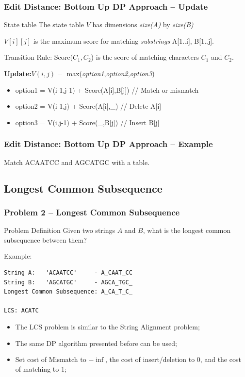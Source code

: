 \begin{frame}
  \frametitle{Edit Distance: Bottom Up DP Approach -- Update}
  \begin{block}{State table}
    The state table $V$ has dimensions \emph{size(A)} by \emph{size(B)}
    \smallskip

    $V[i][j]$ is the maximum score for matching \emph{substrings} A[1..i], B[1..j].
  \end{block}
  \begin{exampleblock}{Transition Rule:}
    Score($C_1,C_2$) is the score of matching characters $C_1$ and $C_2$.\bigskip


    {\bf Update:}$V(i,j) = $ max(\emph{option1},\emph{option2},\emph{option3})
    \begin{itemize}
    \item option1 = V(i-1,j-1) + Score(A[i],B[j]) // Match or mismatch
    \item option2 = V(i-1,j) + Score(A[i],\_) // Delete A[i]
    \item option3 = V(i,j-1) + Score(\_,B[j]) // Insert B[j]
    \end{itemize}
  \end{exampleblock}
\end{frame}

\begin{frame}
  \frametitle{Edit Distance: Bottom Up DP Approach -- Example}
  Match ACAATCC and AGCATGC with a table.

\end{frame}


\subsection{Longest Common Subsequence}

\begin{frame}[fragile]
  \frametitle{Problem 2 -- Longest Common Subsequence}
  {\smaller
    \begin{block}{Problem Definition}
      Given two strings $A$ and $B$, what is the longest common
      subsequence between them?

      \medskip

      Example:
\begin{verbatim}
String A:   'ACAATCC'     - A_CAAT_CC
String B:   'AGCATGC'     - AGCA_TGC_
Longest Common Subsequence: A_CA_T_C_

LCS: ACATC
\end{verbatim}
    \end{block}

    \begin{itemize}
    \item The LCS problem is similar to the String Alignment problem;
    \item The same DP algorithm presented before can be used;
    \item Set cost of Mismatch to $-\inf$, the cost of insert/deletion
      to 0, and the cost of matching to 1;
    \end{itemize}
  }
\end{frame}

